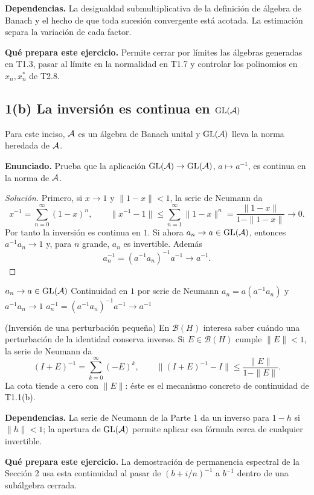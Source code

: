 \noindent\textbf{Dependencias.} La desigualdad submultiplicativa de la definición de álgebra de Banach y el hecho de que toda sucesión convergente está acotada. La estimación separa la variación de cada factor.

\noindent\textbf{Qué prepara este ejercicio.} Permite cerrar por límites las álgebras generadas en T1.3, pasar al límite en la normalidad en T1.7 y controlar los polinomios en $x_n,x_n^*$ de T2.8.

\subsection*{1(b) La inversión es continua en $\operatorname{GL}(\mathcal A)$}

Para este inciso, $\mathcal A$ es un álgebra de Banach unital y $\operatorname{GL}(\mathcal A)$ lleva la norma heredada de
$\mathcal A$.

\noindent\textbf{Enunciado.} Prueba que la aplicación $\operatorname{GL}(\mathcal A)\to\operatorname{GL}(\mathcal A)$, $a\mapsto a^{-1}$, es continua en la norma de $\mathcal A$.

\begin{proof}[Solución]
Primero, si $x\to1$ y $\|1-x\|<1$, la serie de Neumann da
\[
 x^{-1}=\sum_{n=0}^\infty(1-x)^n,
 \qquad
 \|x^{-1}-1\|
 \le \sum_{n=1}^\infty\|1-x\|^n
 =\frac{\|1-x\|}{1-\|1-x\|}\to0.
\]
Por tanto la inversión es continua en $1$. Si ahora $a_n\to a\in\operatorname{GL}(\mathcal A)$, entonces
$a^{-1}a_n\to1$ y, para $n$ grande, $a_n$ es invertible. Además
\[
 a_n^{-1}=(a^{-1}a_n)^{-1}a^{-1}\longrightarrow a^{-1}.
\]
\end{proof}

\proofdiagram
{$a_n\to a\in\operatorname{GL}(\mathcal A)$}
{Continuidad en $1$ por serie de Neumann}
{$a_n=a(a^{-1}a_n)$ y $a^{-1}a_n\to1$}
{$a_n^{-1}=(a^{-1}a_n)^{-1}a^{-1}\to a^{-1}$}

\begin{cthejemplo}{(Inversión de una perturbación pequeña)}
En $\mathcal B(H)$ interesa saber cuándo una perturbación de la identidad conserva inverso.
Si $E\in\mathcal B(H)$ cumple $\|E\|<1$, la serie de Neumann da
\[
 (I+E)^{-1}=\sum_{k=0}^{\infty}(-E)^k,
 \qquad \|(I+E)^{-1}-I\|\le\frac{\|E\|}{1-\|E\|}.
\]
La cota tiende a cero con $\|E\|$: éste es el mecanismo concreto de continuidad de T1.1(b).
\end{cthejemplo}

\noindent\textbf{Dependencias.} La serie de Neumann de la Parte 1 da un inverso para $1-h$ si $\|h\|<1$; la apertura de $\operatorname{GL}(\mathcal A)$ permite aplicar esa fórmula cerca de cualquier invertible.

\noindent\textbf{Qué prepara este ejercicio.} La demostración de permanencia espectral de la Sección 2 usa esta continuidad al pasar de $(b+i/n)^{-1}$ a $b^{-1}$ dentro de una subálgebra cerrada.

